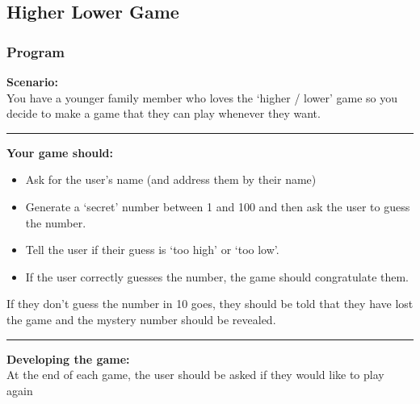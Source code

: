 \documentclass[a4paper,12pt]{article}
\begin{document}
\subsection{Higher Lower Game}
\subsubsection{Program}

\textbf{Scenario:}\\
You have a younger family member who loves the ‘higher / lower’ game so you decide to make a game that they can play whenever they want.\\
\hrule\vspace{0.5cm}
\textbf{Your game should:}
\begin{itemize}
	\item Ask for the user’s name (and address them by their name)
	\item Generate a ‘secret’ number between 1 and 100 and then ask the user to guess the number.
	\item Tell the user if their guess is ‘too high’ or ‘too low’.
	\item If the user correctly guesses the number, the game should congratulate them.
\end{itemize}
If they don’t guess the number in 10 goes, they should be told that they have lost the game and the mystery number should be revealed.\\
\hrule\vspace{0.5cm}
\textbf{Developing the game:}\\
At the end of each game, the user should be asked if they would like to play again
\end{document}

